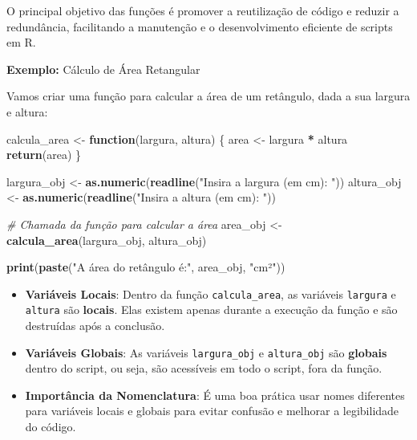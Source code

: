 \documentclass[
]{book}
\newenvironment{Shaded}{\begin{snugshade}}{\end{snugshade}}
\newcommand{\CommentTok}[1]{\textcolor[rgb]{0.56,0.35,0.01}{\textit{#1}}}
\newcommand{\ControlFlowTok}[1]{\textcolor[rgb]{0.13,0.29,0.53}{\textbf{#1}}}
\newcommand{\FunctionTok}[1]{\textcolor[rgb]{0.13,0.29,0.53}{\textbf{#1}}}
\newcommand{\NormalTok}[1]{#1}
\newcommand{\OtherTok}[1]{\textcolor[rgb]{0.56,0.35,0.01}{#1}}
\newcommand{\SpecialCharTok}[1]{\textcolor[rgb]{0.81,0.36,0.00}{\textbf{#1}}}
\newcommand{\StringTok}[1]{\textcolor[rgb]{0.31,0.60,0.02}{#1}}
\providecommand{\tightlist}{%
  \setlength{\itemsep}{0pt}\setlength{\parskip}{0pt}}
\begin{document}
O principal objetivo das funções é promover a reutilização de código e
reduzir a redundância, facilitando a manutenção e o desenvolvimento
eficiente de scripts em R.

\textbf{Exemplo:} Cálculo de Área Retangular

Vamos criar uma função para calcular a área de um retângulo, dada a sua
largura e altura:

\begin{Shaded}
\begin{Highlighting}[]
\NormalTok{calcula\_area }\OtherTok{\textless{}{-}} \ControlFlowTok{function}\NormalTok{(largura, altura) \{}
\NormalTok{  area }\OtherTok{\textless{}{-}}\NormalTok{ largura }\SpecialCharTok{*}\NormalTok{ altura}
  \FunctionTok{return}\NormalTok{(area)}
\NormalTok{\}}

\NormalTok{largura\_obj }\OtherTok{\textless{}{-}} \FunctionTok{as.numeric}\NormalTok{(}\FunctionTok{readline}\NormalTok{(}\StringTok{"Insira a largura (em cm): "}\NormalTok{))}
\NormalTok{altura\_obj }\OtherTok{\textless{}{-}} \FunctionTok{as.numeric}\NormalTok{(}\FunctionTok{readline}\NormalTok{(}\StringTok{"Insira a altura (em cm): "}\NormalTok{))}

\CommentTok{\# Chamada da função para calcular a área}
\NormalTok{area\_obj }\OtherTok{\textless{}{-}} \FunctionTok{calcula\_area}\NormalTok{(largura\_obj, altura\_obj) }

\FunctionTok{print}\NormalTok{(}\FunctionTok{paste}\NormalTok{(}\StringTok{"A área do retângulo é:"}\NormalTok{, area\_obj, }\StringTok{"cm²"}\NormalTok{))}
\end{Highlighting}
\end{Shaded}

\begin{itemize}
\tightlist
\item
  \textbf{Variáveis Locais}: Dentro da função \texttt{calcula\_area}, as variáveis
  \texttt{largura} e \texttt{altura} são \textbf{locais}. Elas existem apenas durante a
  execução da função e são destruídas após a conclusão.
\item
  \textbf{Variáveis Globais}: As variáveis \texttt{largura\_obj} e \texttt{altura\_obj} são
  \textbf{globais} dentro do script, ou seja, são acessíveis em todo o
  script, fora da função.
\item
  \textbf{Importância da Nomenclatura}: É uma boa prática usar nomes
  diferentes para variáveis locais e globais para evitar confusão e
  melhorar a legibilidade do código.
\end{itemize}
\end{document}
